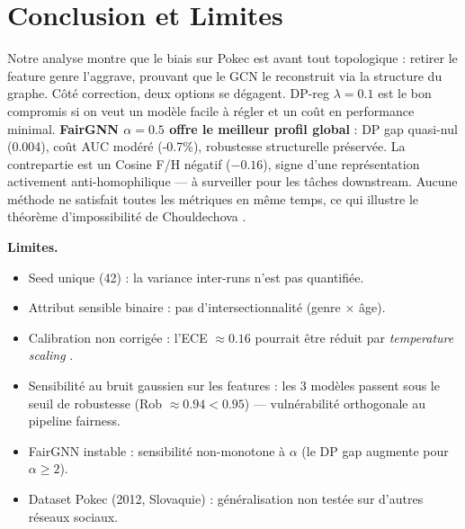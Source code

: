 \documentclass[conference, a4paper]{IEEEtran}
\begin{document}
\section{Conclusion et Limites}
Notre analyse montre que le biais sur Pokec est avant tout topologique : retirer le feature genre l'aggrave, prouvant que le GCN le reconstruit via la structure du graphe. Côté correction, deux options se dégagent. DP-reg $\lambda=0.1$ est le bon compromis si on veut un modèle facile à régler et un coût en performance minimal. \textbf{FairGNN $\alpha=0.5$ offre le meilleur profil global} : DP gap quasi-nul (0.004), coût AUC modéré (-0.7\%), robustesse structurelle préservée. La contrepartie est un Cosine F/H négatif ($-0.16$), signe d'une représentation activement anti-homophilique — à surveiller pour les tâches downstream. Aucune méthode ne satisfait toutes les métriques en même temps, ce qui illustre le théorème d'impossibilité de Chouldechova \cite{chouldechova2017fair}.

\textbf{Limites.}
\begin{itemize}
\item Seed unique (42) : la variance inter-runs n'est pas quantifiée.
\item Attribut sensible binaire : pas d'intersectionnalité (genre $\times$ âge).
\item Calibration non corrigée : l'ECE $\approx 0.16$ pourrait être réduit par \textit{temperature scaling} \cite{guo2017calibration}.
\item Sensibilité au bruit gaussien sur les features : les 3 modèles passent sous le seuil de robustesse (Rob $\approx 0.94 < 0.95$) — vulnérabilité orthogonale au pipeline fairness.
\item FairGNN instable : sensibilité non-monotone à $\alpha$ (le DP gap augmente pour $\alpha \ge 2$).
\item Dataset Pokec (2012, Slovaquie) : généralisation non testée sur d'autres réseaux sociaux.
\end{itemize}
\end{document}

